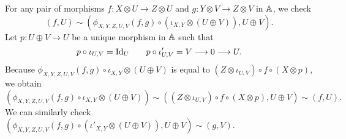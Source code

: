 For any pair of morphisms $f \colon X \otimes U \to Z \otimes U$ and
$g \colon Y \otimes V \to Z \otimes V$ in $\mathbb{A}$, we check
\begin{equation*}
  (f,U) \sim (\phi_{X,Y,Z,U,V}(f,g) \circ (\iota_{X,Y} \otimes (U \oplus
  V)), U \oplus V).
\end{equation*}
Let $p \colon U \oplus V \to U$ be a unique morphism in $\mathbb{A}$
such that
\begin{equation*}
  p \circ \iota_{U,V} = \mbox{\normalfont Id}_{U} \qquad
  p \circ \iota'_{U,V} = V \longrightarrow 0 \longrightarrow U.
\end{equation*}
Because $\phi_{X,Y,Z,U,V}(f,g) \circ \iota_{X,Y} \otimes (U \oplus V)$
is equal to $(Z \otimes \iota_{U,V}) \circ f \circ (X \otimes p)$, we obtain
\begin{equation*}
  (\phi_{X,Y,Z,U,V}(f,g) \circ \iota_{X,Y} \otimes (U \oplus V))
  \sim ((Z \otimes \iota_{U,V}) \circ f \circ (X \otimes p), U \oplus V)
  \sim (f,U).
\end{equation*}
We can similarly check $(\phi_{X,Y,Z,U,V}(f,g) \circ (\iota'_{X,Y} \otimes (U \oplus V)),U
\oplus V) \sim (g,V)$.


